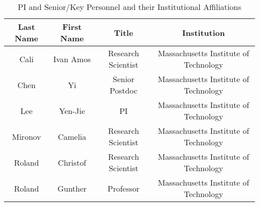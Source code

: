 
\begin{table}[h]
\centering
 \caption{PI and Senior/Key Personnel and their Institutional Affiliations}
  \begin{tabular}{ | c | c | c | c | }
    \hline
    \textbf{Last Name} &  \textbf{First Name} &  \textbf{Title} & \textbf{Institution} \\ \hline
    Cali & Ivan Amos & Research Scientist &  Massachusetts Institute of Technology\\ \hline
    Chen & Yi & Senior Postdoc &  Massachusetts Institute of Technology\\ \hline
    Lee & Yen-Jie & PI &  Massachusetts Institute of Technology\\ \hline
    Mironov & Camelia & Research Scientist &  Massachusetts Institute of Technology\\ \hline
    Roland & Christof & Research Scientist &  Massachusetts Institute of Technology\\ \hline        
    Roland & Gunther & Professor &  Massachusetts Institute of Technology\\ \hline        
  \end{tabular}
\end{table}



